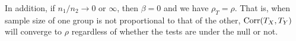 	In addition, if $n_1/n_2 \rightarrow 0$ or $\infty$, then $\beta = 0$ and we have $\rho_T = 
	\rho$. That is, when sample size of one group is not proportional to that of the other, 
	$\text{Corr}(T_X, T_Y)$ will converge to $\rho$ regardless of whether the tests are under the null or 
	not. 	
	
	
	
